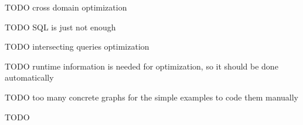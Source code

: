 TODO cross domain optimization

TODO SQL is just not enough

TODO intersecting queries optimization

TODO runtime information is needed for optimization, so it should be done automatically

TODO too many concrete graphs for the simple examples to code them manually

TODO

